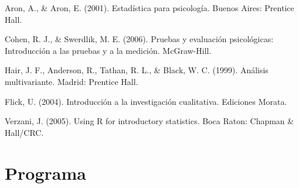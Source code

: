 \documentclass[letterpaper,11pt]{article}
\begin{document}
{\leftskip 0.5in
\parindent -0.5in

Aron, A., \& Aron, E. (2001). Estad\'istica para psicolog\'ia. Buenos Aires: Prentice Hall.

Cohen, R. J., \& Swerdlik, M. E. (2006). Pruebas y evaluaci\'on psicol\'ogicas: Introducci\'on a las pruebas y a la medici\'on. McGraw-Hill.

Hair, J. F., Anderson, R., Tathan, R. L., \& Black, W. C. (1999). An\'alisis multivariante. Madrid: Prentice Hall.

Flick, U. (2004). Introducci\'on a la investigaci\'on cualitativa. Ediciones Morata.

Verzani, J. (2005). Using R for introductory statistics. Boca Raton: Chapman \& Hall/CRC.

}

\section{Programa}
\end{document}

